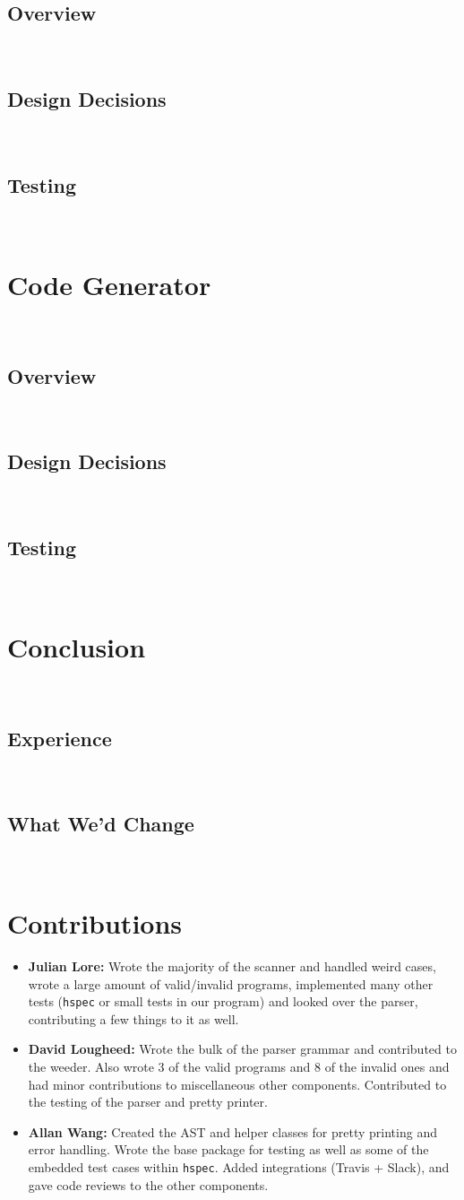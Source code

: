 \documentclass[11pt]{article}
\begin{document}
\subsection{Overview}~%
\subsection{Design Decisions}~%
\subsection{Testing}~%
\section{Code Generator}~%
\subsection{Overview}~%
\subsection{Design Decisions}~%
\subsection{Testing}~%
\section{Conclusion}~%
\subsection{Experience}~%
\subsection{What We'd Change}~%
\section{Contributions}
\begin{itemize}
	\item \textbf{Julian Lore:} Wrote the majority of the scanner and handled weird
	      cases, wrote a large amount of valid/invalid programs, implemented
	      many other tests (\texttt{hspec} or small tests in our program) and looked
	      over the parser, contributing a few things to it as well.
	\item \textbf{David Lougheed:} Wrote the bulk of the parser grammar and contributed to
	      the weeder. Also wrote 3 of the valid programs and 8 of the
	      invalid ones and had minor contributions to miscellaneous other components.
	      Contributed to the testing of the parser and pretty printer.
	\item \textbf{Allan Wang:} Created the AST and helper classes for pretty printing
	      and error handling.  Wrote the base package for testing as well as
	      some of the embedded test cases within \texttt{hspec}.  Added integrations
	      (Travis + Slack), and gave code reviews to the other components.
\end{itemize}
\end{document}
